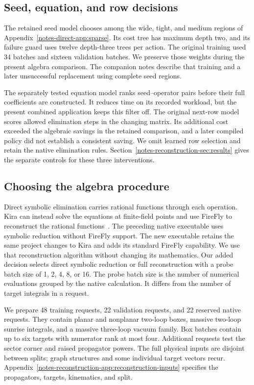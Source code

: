 \documentclass[11pt,a4paper]{article}
\begin{document}
\subsection{Seed, equation, and row decisions}
The retained seed model chooses among the wide, tight, and medium regions of Appendix~\ref{notes-direct-app:sparse}. Its cost tree has maximum depth two, and its failure guard uses twelve depth-three trees per action. The original training used 34 batches and sixteen validation batches. We preserve those weights during the present algebra comparison. The companion notes describe that training and a later unsuccessful replacement using complete seed regions.

The separately tested equation model ranks seed--operator pairs before their full coefficients are constructed. It reduces time on its recorded workload, but the present combined application keeps this filter off. The original next-row model scores allowed elimination steps in the changing matrix. Its additional cost exceeded the algebraic savings in the retained comparison, and a later compiled policy did not establish a consistent saving. We omit learned row selection and retain the native elimination rules. Section~\ref{notes-reconstruction-sec:results} gives the separate controls for these three interventions.

\subsection{Choosing the algebra procedure}
Direct symbolic elimination carries rational functions through each operation. Kira can instead solve the equations at finite-field points and use FireFly to reconstruct the rational functions~\cite{Kira2,FireFly2019,FireFly2020}. The preceding native executable uses symbolic reduction without FireFly support. The new executable retains the same project changes to Kira and adds its standard FireFly capability. We use that reconstruction algorithm without changing its mathematics. Our added decision selects direct symbolic reduction or full reconstruction with a probe batch size of 1, 2, 4, 8, or 16. The probe batch size is the number of numerical evaluations grouped by the native calculation. It differs from the number of target integrals in a request.

We prepare 48 training requests, 22 validation requests, and 22 reserved native requests. They contain planar and nonplanar two-loop boxes, massive two-loop sunrise integrals, and a massive three-loop vacuum family. Box batches contain up to six targets with numerator rank at most four. Additional requests test the sector corner and raised propagator powers. The full physical inputs are disjoint between splits; graph structures and some individual target vectors recur. Appendix~\ref{notes-reconstruction-app:reconstruction-inputs} specifies the propagators, targets, kinematics, and split.
\end{document}
